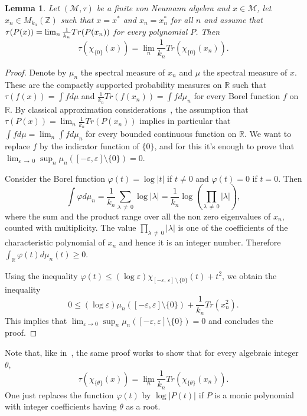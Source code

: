 \documentclass[10pt]{amsart}
\newtheorem{lemm}[cdrthm]{Lemma}
\theoremstyle{definition}
\newcommand{\Rmath}{\mathbb{R}}
\newcommand{\Zmath}{\mathbb{Z}}
\newcommand{\cM}{\mathcal{M}}
\begin{document}
\begin{lemm}\label{lem:lueck_approximation}
Let $(\cM,\tau)$ be a finite von Neumann algebra and $x \in \cM$, let $x_n \in M_{k_n}(\Zmath)$ such that $x=x^*$ and $x_n=x_n^*$ for all $n$ and assume that $\tau(P(x))\linebreak= \lim_n \tfrac 1 {k_n} Tr(P(x_n))$ for every polynomial $P$. Then
\[
\tau\left(\chi_{\{0\}}(x)\right) = \lim_n \frac 1 {k_n} Tr\left(\chi_{\{0\}}(x_n)\right).
\]
\end{lemm}
\begin{proof}
Denote by $\mu_n$ the spectral measure of $x_n$ and $\mu$ the spectral measure of $x$. These are the compactly supported probability measures on $\Rmath$ such that $\tau(f(x))=\int fd\mu$ and $\frac{1}{k_n} Tr (f(x_n)) = \int f d\mu_n$ for every Borel function $f$ on $\Rmath$. By classical approximation considerations~\cite[Theorem~30.2]{billinglsey}, the assumption that $\tau(P(x)) = \lim_n \tfrac 1 {k_n} Tr (P(x_n))$ implies in particular that $\int f d\mu = \lim_n \int f d\mu_n$ for every bounded continuous function on $\Rmath$. We want to replace $f$ by the indicator function of $\{0\}$, and for this it's enough to prove that $\lim_{\varepsilon\,\to\,0} \sup_n \mu_n([-\varepsilon,\varepsilon]\setminus \{0\}) = 0$.

Consider the Borel function $\varphi(t) = \log |t|$ if $t \neq 0$ and $\varphi(t)=0$ if $t=0$. Then
\[
\int \varphi d\mu_n = \frac 1 {k_n} \sum_{\lambda\,\neq\,0} \log |\lambda|=\frac 1 {k_n} \log\left(\prod_{\lambda\,\neq\,0}|\lambda|\right),
\]
where the sum and the product range over all the non zero eigenvalues of $x_n$, counted with multiplicity. The value $\prod_{\lambda\,\neq\,0}|\lambda|$ is one of the coefficients of the characteristic polynomial of $x_n$ and hence it is an integer number. Therefore $ \int_\Rmath \varphi(t) d\mu_n(t)\geq 0$.


Using the inequality $\varphi(t) \leq (\log \varepsilon) \chi_{[-\varepsilon,\,\varepsilon]\,\setminus\,\{0\}}(t) + t^2$, we obtain the inequality
\[
0 \leq (\log \varepsilon) \mu_n\left([-\varepsilon,\varepsilon]\setminus \{0\}\right) + \frac{1}{k_n} Tr\left(x_n^2\right).
\]
This implies that $\lim_{\varepsilon \to 0} \sup_n \mu_n([-\varepsilon,\varepsilon]\setminus \{0\}) = 0$ and concludes the proof.
\end{proof}

Note that, like in~\cite{thom08}, the same proof works to show that for every algebraic integer $\theta$,
\[
\tau\left(\chi_{\{\theta\}}(x)\right) = \lim_n \frac 1 {k_n} Tr\left(\chi_{\{\theta\}}(x_n)\right).
\]
One just replaces the function $\varphi(t)$ by $\log|P(t)|$ if $P$ is a monic polynomial with integer coefficients having $\theta$ as a root.
\end{document}
